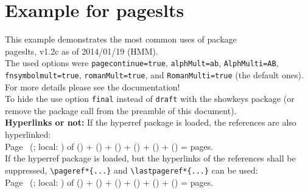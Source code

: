 \documentclass[british]{article}
\begin{document}

\section*{Example for pageslts}

This example demonstrates the most common uses of package\\
\textsf{pageslts}, v1.2c as of 2014/01/19 (HMM).\\
The used options were \texttt{pagecontinue=true},
\texttt{alphMult=ab}, \texttt{AlphMulti=AB}, \linebreak
\texttt{fnsymbolmult=true},
\texttt{romanMult=true}, and \texttt{RomanMulti=true}
(the default ones).\\
For more details please see the documentation!\\

\label{keys} To hide the \pageref{keys}{\qquad } use option
\texttt{final} instead of \texttt{draft} with the \textsf{showkeys}
package (or remove the package call from the preamble of
this document).\\

\textbf{Hyperlinks or not:} If the \textsf{hyperref} package is loaded,
the references are also hyperlinked:\\
\smallskip
Page \thepage\ (\theCurrentPage; local: \theCurrentPageLocal) of %
() + %
() + %
() + %
() + %
() + %
() = %
 pages.\\
If the \textsf{hyperref} package is loaded, but the hyperlinks of the
references shall be suppressed, \verb|\pageref*{...}|
and \verb|\lastpageref*{...}| can be used:\\
Page \thepage\ (\theCurrentPage; local: \theCurrentPageLocal) of %
() + %
() + %
() + %
() + %
() + %
() = %
 pages.\\
\end{document}
